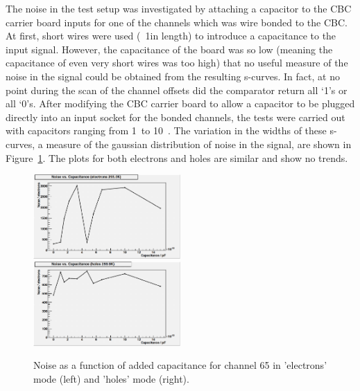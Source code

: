 The noise in the test setup was investigated by attaching a capacitor to the CBC carrier board inputs for one
of the channels which was wire bonded to the CBC. At first, short wires were used (~1\cm in length) to
introduce a capacitance to the input signal. However, the capacitance of the board was so low (meaning the
capacitance of even very short wires was too high) that no useful measure of the noise in the signal could be
obtained from the resulting s-curves. In fact, at no point during the scan of the channel offsets did the
comparator return all `1's or all `0's. After modifying the CBC carrier board to allow a capacitor to be
plugged directly into an input socket for the bonded channels, the tests were carried out with capacitors
ranging from 1~\pF to 10~\pF. The variation in the widths of these s-curves, a measure of the gaussian
distribution of noise in the signal, are shown in Figure~\ref{fig:noise_v_capacitance}. The plots for both
electrons and holes are similar and show no trends.

\begin{figure}[hbtp]
   \centering
     \includegraphics[width=0.5\textwidth]{Chapters/07_Appendices/07c_2_Images/noise_v_capacitance_ch_65_electrons}\hfill
     \includegraphics[width=0.5\textwidth]{Chapters/07_Appendices/07c_2_Images/noise_v_capacitance_ch_65_holes}\hfill
     \caption{Noise as a function of added capacitance for channel 65 in 'electrons' mode (left) and 'holes'
     mode (right).}
     \label{fig:noise_v_capacitance}
\end{figure}

